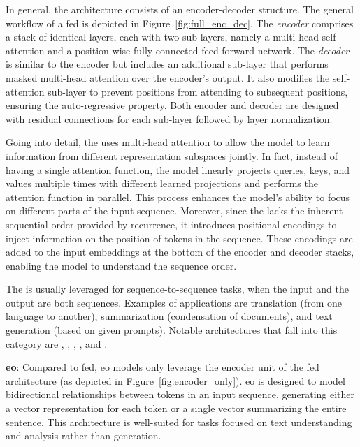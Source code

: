 %
In general, the  architecture consists of an encoder-decoder structure. The general workflow of a \gls{fed} is depicted in Figure~\ref{fig:full_enc_dec}.
%
The \emph{encoder} comprises a stack of identical layers, each with two sub-layers, namely a multi-head self-attention and a position-wise fully connected feed-forward network.
The \emph{decoder} is similar to the encoder but includes an additional sub-layer that performs masked multi-head attention over the encoder's output. It also modifies the self-attention sub-layer to prevent positions from attending to subsequent positions, ensuring the auto-regressive property.
Both encoder and decoder are designed with residual connections for each sub-layer followed by layer normalization.

Going into detail, the  uses multi-head attention to allow the model
%
to learn information from different representation subspaces jointly.
In fact, instead of having a single attention function, 
%
the model linearly projects queries, keys, and values multiple times with different learned projections and performs the attention function in parallel. This process enhances the model's ability to focus on different parts of the input sequence.
Moreover, since the  lacks the inherent sequential order provided by recurrence, it introduces positional encodings to inject information on the position of tokens in the sequence. These encodings are added to the input embeddings at the bottom of the encoder and decoder stacks, enabling the model to understand the sequence order.

%
The  is usually leveraged for sequence-to-sequence tasks, 
%
\ie when the input and the output are both sequences. Examples of applications are translation (from one language to another), summarization (condensation of documents), and text generation (based on given prompts).
Notable architectures that fall into this category are , , , , and .



%
\vspace{5pt}
\noindent
\textbf{\gls{eo}}: Compared to \gls{fed}, \gls{eo} models only leverage the encoder unit of the \gls{fed} architecture (as depicted in Figure~\ref{fig:encoder_only}). 
\gls{eo} is designed to model bidirectional relationships between tokens in an input sequence, generating either a vector representation for each token or a single vector summarizing the entire sentence. This architecture is well-suited for tasks focused on text understanding and analysis rather than generation.

